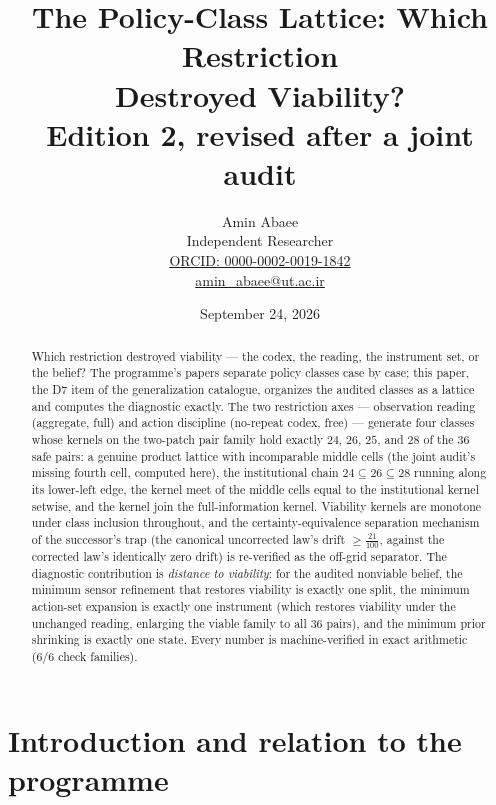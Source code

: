 \documentclass[10pt,twocolumn]{article}
\theoremstyle{definition}
\begin{document}
\title{The Policy-Class Lattice: Which Restriction\\ Destroyed Viability?\\[0.2em]
{\large\rmfamily Edition 2, revised after a joint audit}}
\author{Amin Abaee\\[0.35em]
{\small Independent Researcher}\\[0.55em]
{\small\href{https://orcid.org/0000-0002-0019-1842}{ORCID: 0000-0002-0019-1842}}\\[0.3em]
{\small\href{mailto:amin\_abaee@ut.ac.ir}{amin\_abaee@ut.ac.ir}}}
\date{September 24, 2026}
\maketitle

\begin{abstract}
Which restriction destroyed viability --- the codex, the reading, the
instrument set, or the belief? The programme's papers separate policy
classes case by case; this paper, the D7 item of the generalization
catalogue, organizes the audited classes as a lattice and computes the
diagnostic exactly. The two restriction axes --- observation reading
(aggregate, full) and action discipline (no-repeat codex, free) --- generate
four classes whose kernels on the two-patch pair family hold exactly
$24$, $26$, $25$, and $28$ of the $36$ safe pairs: a genuine product
lattice with incomparable middle cells (the joint audit's missing fourth
cell, computed here), the institutional chain
$24\subseteq 26\subseteq 28$ running along its lower-left edge, the
kernel meet of the middle cells equal to the institutional kernel setwise,
and the kernel join the full-information kernel. Viability kernels are
monotone under class inclusion throughout, and the certainty-equivalence
separation mechanism of the successor's trap (the canonical uncorrected
law's drift $\ge\tfrac{21}{100}$, against the corrected law's identically
zero drift) is re-verified as the off-grid separator. The diagnostic contribution is
\emph{distance to viability}: for the audited nonviable belief, the
minimum sensor refinement that restores viability is exactly one split,
the minimum action-set expansion is exactly one instrument (which restores
viability under the unchanged reading, enlarging the viable family to all
$36$ pairs), and the minimum prior shrinking is exactly one state. Every
number is machine-verified in exact arithmetic (6/6 check families).
\end{abstract}

\section{Introduction and relation to the programme}
\end{document}
